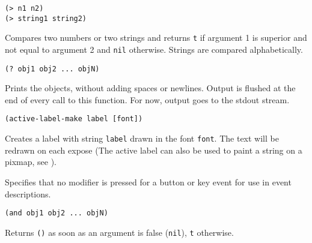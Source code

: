         
{\usagefont\begin{verbatim}
(> n1 n2)
(> string1 string2)
\end{verbatim}}\usageupspace

Compares two numbers or two strings and returns \verb"t" if argument 1 is
superior and not equal to argument 2 and \verb"nil" otherwise. Strings are
compared alphabetically.

        
{\usagefont\begin{verbatim}
(? obj1 obj2 ... objN)
\end{verbatim}}\usageupspace

Prints the objects, without adding spaces or newlines. Output is flushed at
the end of every call to this function. For now, output goes to the stdout
stream.

        
{\usagefont\begin{verbatim}
(active-label-make label [font])
\end{verbatim}}\usageupspace

Creates a label with string \verb|label| drawn
in the font \verb"font". The text will be redrawn on each expose (The
active label can also be used to paint a string on a pixmap, see
).


        

Specifies that no modifier is pressed for a button or key event for use in
event descriptions.

        
{\usagefont\begin{verbatim}
(and obj1 obj2 ... objN)
\end{verbatim}}\usageupspace

Returns \verb"()" as soon as an argument is false (\verb"nil"),
\verb"t" otherwise.

        
